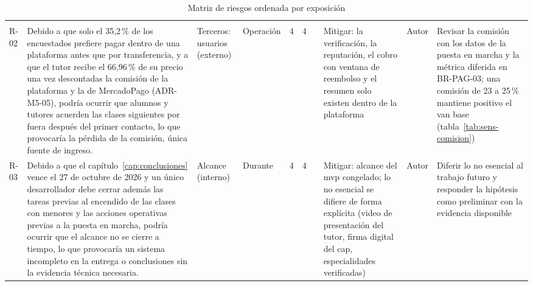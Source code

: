 \begin{landscape}
\small
\begin{xltabular}{\linewidth}{l >{\raggedright\arraybackslash{}\hsize}X >{\raggedright\arraybackslash}p{2.3cm} >{\raggedright\arraybackslash}p{1.7cm} c c c >{\raggedright\arraybackslash{}\hsize}X >{\raggedright\arraybackslash}p{1.5cm} >{\raggedright\arraybackslash{}\hsize}X}
    \caption{Matriz de riesgos ordenada por exposición}
    \label{tab:matriz-riesgos} \\
    \toprule
     &  &  &  &  &  &  &  &  &  \\
    \midrule
    \endfirsthead
    \toprule
     &  &  &  &  &  &  &  &  &  \\
    \midrule
    \endhead
    \bottomrule
    \endfoot
    R-02 & Debido a que solo el 35,2\,\% de los encuestados prefiere pagar dentro de una plataforma antes que por transferencia, y a que el tutor recibe el 66,96\,\% de su precio una vez descontadas la comisión de la plataforma y la de MercadoPago (ADR-M5-05), podría ocurrir que alumnos y tutores acuerden las clases siguientes por fuera después del primer contacto, lo que provocaría la pérdida de la comisión, única fuente de ingreso. & Terceros: usuarios (externo) & Operación & 4 & 4 &  & Mitigar: la verificación, la reputación, el cobro con ventana de reembolso y el resumen solo existen dentro de la plataforma & Autor & Revisar la comisión con los datos de la puesta en marcha y la métrica diferida en BR-PAG-03; una comisión de 23 a 25\,\% mantiene positivo el \gls{van} base (tabla~\ref{tab:sens-comision}) \\
    R-03 & Debido a que el capítulo~\ref{cap:conclusiones} vence el 27 de octubre de 2026 y un único desarrollador debe cerrar además las tareas previas al encendido de las clases con menores y las acciones operativas previas a la puesta en marcha, podría ocurrir que el alcance no se cierre a tiempo, lo que provocaría un sistema incompleto en la entrega o conclusiones sin la evidencia técnica necesaria. & Alcance (interno) & Durante & 4 & 4 &  & Mitigar: alcance del \gls{mvp} congelado; lo no esencial se difiere de forma explícita (video de presentación del tutor, firma digital del \gls{cap}, especialidades verificadas) & Autor & Diferir lo no esencial al trabajo futuro y responder la hipótesis como preliminar con la evidencia disponible \\

\end{xltabular}
\end{landscape}
